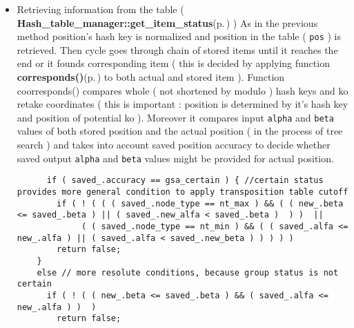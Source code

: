 \begin{itemize}
\item Retrieving information from the table ( {\bf Hash\_\-table\_\-manager::get\_\-item\_\-status}{\rm (p.\,\pageref{classHash__table__manager_a6})} ) As in the previous method position's hash key is normalized and position in the table ( {\tt pos} ) is retrieved. Then cycle goes through chain of stored items until it reaches the end or it founds corresponding item ( this is decided by applying function {\bf corresponds()}{\rm (p.\,\pageref{t__search_8cc_a0})} to both actual and stored item ). Function coorresponds() compares whole ( not shortened by modulo ) hash keys and ko retake coordinates ( this is important : position is determined by it's hash key and position of potential ko ). Moreover it compares input {\tt alpha} and {\tt beta} values of both stored position and the actual position ( in the process of tree search ) and takes into account saved position accuracy to decide whether saved output {\tt alpha} and {\tt beta} values might be provided for actual position. 

\footnotesize\begin{verbatim}      if ( saved_.accuracy == gsa_certain ) { //certain status provides more general condition to apply transposition table cutoff
        if ( ! ( ( ( saved_.node_type == nt_max ) && ( ( new_.beta <= saved_.beta ) || ( saved_.new_alfa < saved_.beta )  ) )  || 
             ( ( saved_.node_type == nt_min ) && ( ( saved_.alfa <= new_.alfa ) || ( saved_.alfa < saved_.new_beta ) ) ) ) ) 
        return false;
    } 
    else // more resolute conditions, because group status is not certain 
      if ( ! ( ( new_.beta <= saved_.beta ) && ( saved_.alfa <= new_.alfa ) )  ) 
        return false;
\end{verbatim}
\normalsize
 \end{itemize}
